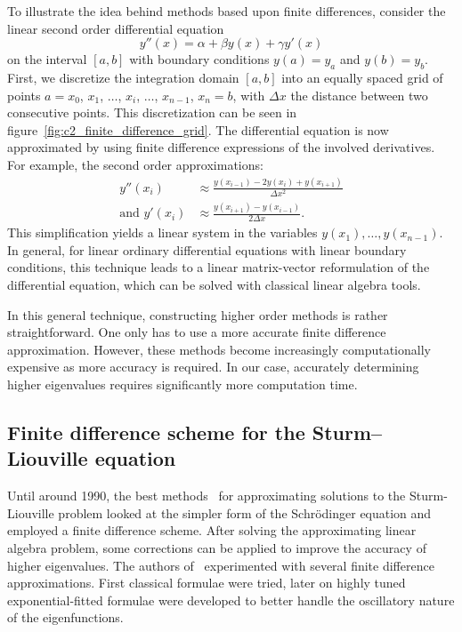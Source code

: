 To illustrate the idea behind methods based upon finite differences, consider the linear second order differential equation
$$
    y''(x) = \alpha + \beta y(x) + \gamma y'(x)
$$
on the interval $[a, b]$ with boundary conditions $y(a) = y_a$ and $y(b) = y_b$. First, we discretize the integration domain $[a, b]$ into an equally spaced grid of points $a = x_0$, $x_1$, $\dots$, $x_i$, $\dots$, $x_{n-1}$, $x_{n} = b$, with $\Delta x$ the distance between two consecutive points. This discretization can be seen in figure~\ref{fig:c2_finite_difference_grid}. The differential equation is now approximated by using finite difference expressions of the involved derivatives. For example, the second order approximations:
\begin{align*}
    y''(x_i)            & \approx \frac{y(x_{i-1}) - 2 y(x_i) + y(x_{i+1})}{\Delta x^2} \\
    \text{and } y'(x_i) & \approx \frac{y(x_{i+1}) - y(x_{i-1})}{2 \Delta x}\text{.}
\end{align*}
This simplification yields a linear system in the variables $y(x_1), \dots, y(x_{n-1})$. In general, for linear ordinary differential equations with linear boundary conditions, this technique leads to a linear matrix-vector reformulation of the differential equation, which can be solved with classical linear algebra tools.

In this general technique, constructing higher order methods is rather straightforward. One only has to use a more accurate finite difference approximation. However, these methods become increasingly computationally expensive as more accuracy is required. In our case, accurately determining higher eigenvalues requires significantly more computation time.

\subsection{Finite difference scheme for the Sturm--Liouville equation}

Until around 1990, the best methods~\cite{andrew_correction_1985,vandenberghe_accurate_1991} for approximating solutions to the Sturm-Liouville problem looked at the simpler form of the Schrödinger equation and employed a finite difference scheme. After solving the approximating linear algebra problem, some corrections can be applied to improve the accuracy of higher eigenvalues. The authors of~\cite{andrew_correction_1985,vandenberghe_accurate_1991} experimented with several finite difference approximations. First classical formulae were tried, later on highly tuned exponential-fitted formulae were developed to better handle the oscillatory nature of the eigenfunctions.

